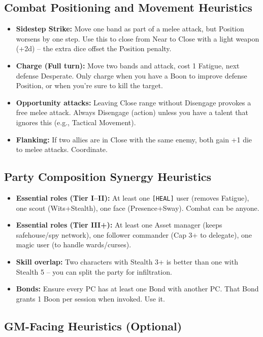 \documentclass[11pt]{article}
\begin{document}
\subsection*{Combat Positioning and Movement Heuristics}

\begin{itemize}
    \item \textbf{Sidestep Strike:} Move one band as part of a melee attack, but Position worsens by one step. Use this to close from Near to Close with a light weapon (+2d) – the extra dice offset the Position penalty.
    \item \textbf{Charge (Full turn):} Move two bands and attack, cost 1 Fatigue, next defense Desperate. Only charge when you have a Boon to improve defense Position, or when you're sure to kill the target.
    \item \textbf{Opportunity attacks:} Leaving Close range without Disengage provokes a free melee attack. Always Disengage (action) unless you have a talent that ignores this (e.g., Tactical Movement).
    \item \textbf{Flanking:} If two allies are in Close with the same enemy, both gain +1 die to melee attacks. Coordinate.
\end{itemize}

\subsection*{Party Composition Synergy Heuristics}

\begin{itemize}
    \item \textbf{Essential roles (Tier I–II):} At least one \texttt{[HEAL]} user (removes Fatigue), one scout (Wits+Stealth), one face (Presence+Sway). Combat can be anyone.
    \item \textbf{Essential roles (Tier III+):} At least one Asset manager (keeps safehouse/spy network), one follower commander (Cap 3+ to delegate), one magic user (to handle wards/curses).
    \item \textbf{Skill overlap:} Two characters with Stealth 3+ is better than one with Stealth 5 – you can split the party for infiltration.
    \item \textbf{Bonds:} Ensure every PC has at least one Bond with another PC. That Bond grants 1 Boon per session when invoked. Use it.
\end{itemize}

\subsection*{GM-Facing Heuristics (Optional)}
\end{document}
